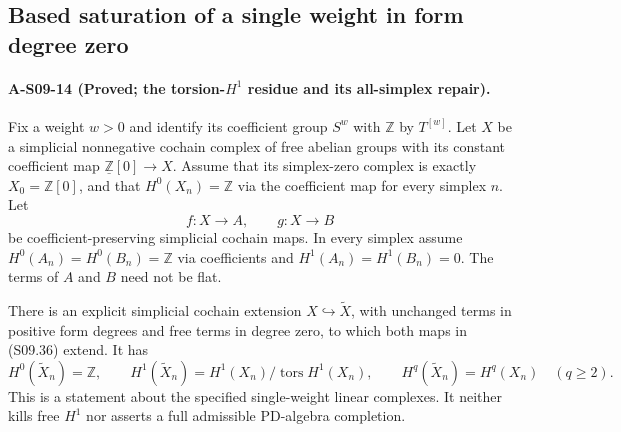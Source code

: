 \subsection{Based saturation of a single weight in form degree zero}

\paragraph{A-S09-14 (Proved; the torsion-$H^1$ residue and its all-simplex repair).}
Fix a weight $w>0$ and identify its coefficient group
$S^w$ with $\mathbb Z$ by $T^{[w]}$.
Let $X$ be a simplicial nonnegative cochain complex of
free abelian groups with its constant coefficient map
$\underline{\mathbb Z}[0]\to X$.
Assume that its simplex-zero complex is exactly
$X_0=\mathbb Z[0]$, and that
$H^0(X_n)=\mathbb Z$ via the coefficient map for every
simplex $n$.  Let
\[
                 f:X\longrightarrow A,
                 \qquad g:X\longrightarrow B
 \tag{S09.36}
\]
be coefficient-preserving simplicial cochain maps.
In every simplex assume
$H^0(A_n)=H^0(B_n)=\mathbb Z$ via coefficients and
$H^1(A_n)=H^1(B_n)=0$.
The terms of $A$ and $B$ need not be flat.

There is an explicit simplicial cochain extension
$X\hookrightarrow\widetilde X$, with unchanged terms
in positive form degrees and free terms in degree zero,
to which both maps in (S09.36) extend.  It has
\[
 H^0(\widetilde X_n)=\mathbb Z,\qquad
 H^1(\widetilde X_n)=H^1(X_n)/\operatorname{tors}H^1(X_n),
 \qquad
 H^q(\widetilde X_n)=H^q(X_n)\quad(q\geq2).
 \tag{S09.37}
\]
This is a statement about the specified single-weight
linear complexes.  It neither kills free $H^1$ nor
asserts a full admissible PD-algebra completion.

